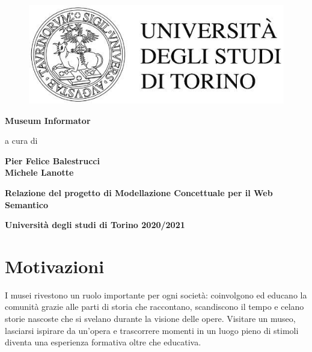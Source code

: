 \documentclass[12pt]{article}
\begin{document}
\begin{figure}[h!]
\vskip1in
\begin{center}
\includegraphics[scale = 2]{fig/logo.jpg}
\end{center}
\end{figure}

\begin{center}
\large{\textbf{Museum Informator}}
\end{center}

\vskip2.5cm

\begin{center}
a cura di
\end{center}

\vskip0.6cm

\begin{center}
\textbf{Pier Felice Balestrucci}\\
\textbf{Michele Lanotte}\\
\end{center}

\vskip3.5cm
 
\begin{center}
\textbf{Relazione del progetto di Modellazione Concettuale per il Web Semantico}
\end{center}

\begin{center}
\textbf{Università degli studi di Torino 2020/2021}
\end{center}
\newpage
\begin{center}
\tableofcontents
\end{center}
\pagebreak
\section{Motivazioni}
I musei rivestono un ruolo importante per ogni società: coinvolgono ed educano la comunità grazie alle parti di storia che raccontano, scandiscono il tempo e celano storie nascoste che si svelano durante la visione delle opere.  
Visitare un museo, lasciarsi ispirare da un’opera e trascorrere momenti in un luogo pieno di stimoli diventa una esperienza formativa oltre che educativa.
\end{document}
